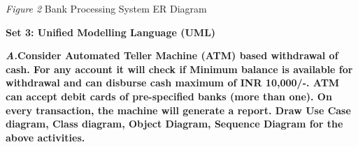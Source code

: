\documentclass[12pt, letterpaper, twoside]{book}
\begin{document}
\begin{center}
\end{center}
\begin{center}
\emph{Figure 2} Bank Processing System ER Diagram
\end{center}
\begin{large}
\pagebreak
\textbf{Set 3: Unified Modelling Language (UML)}
\end{large}
\begin{flushleft}
\textbf{\emph{A.}Consider Automated Teller Machine (ATM) based withdrawal of cash. For  any account it will check if Minimum balance is available for withdrawal and can disburse cash maximum of INR 10,000/-. ATM can accept debit cards of pre-specified banks (more than one). On every transaction, the machine will generate a  report.  Draw  Use  Case  diagram,  Class  diagram,  Object  Diagram,  Sequence  Diagram  for  the  above activities.}
\end{flushleft}
\end{document}
